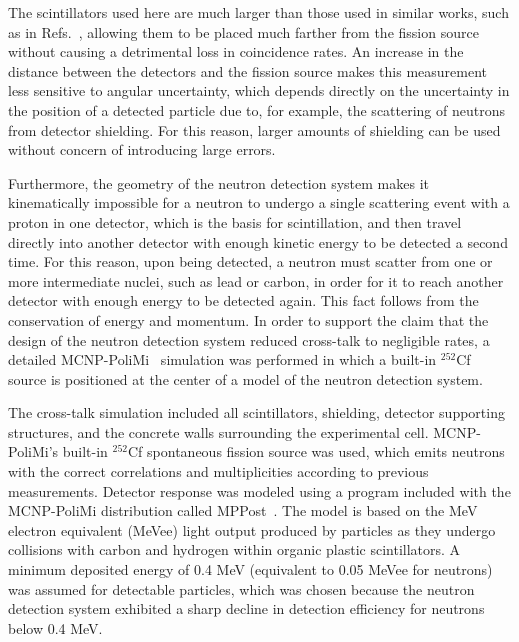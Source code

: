 The scintillators used here are much larger than those used in similar works, such as in Refs.~\cite{Pozzi2016,Verbeke2018}, allowing them to be placed much farther from the fission source without causing a detrimental loss in coincidence rates. 
An increase in the distance between the detectors and the fission source makes this measurement less sensitive to angular uncertainty, which depends directly on the uncertainty in the position of a detected particle due to, for example, the scattering of neutrons from detector shielding.
For this reason, larger amounts of shielding can be used without concern of introducing large errors.
 
Furthermore, the geometry of the neutron detection system makes it kinematically impossible for a neutron to undergo a single scattering event with a proton in one detector, which is the basis for scintillation, and then travel directly into another detector with enough kinetic energy to be detected a second time.
For this reason, upon being detected, a neutron must scatter from one or more intermediate nuclei, such as lead or carbon, in order for it to reach another detector with enough energy to be detected again.
This fact follows from the conservation of energy and momentum.
In order to support the claim that the design of the neutron detection system reduced cross-talk to negligible rates, a detailed MCNP-PoliMi~\cite{MCNP_POLIMI} simulation was performed in which a built-in $^{252}$Cf source is positioned at the center of a model of the neutron detection system.

The cross-talk simulation included all scintillators, shielding, detector supporting structures, and the concrete walls surrounding the experimental cell.
MCNP-PoliMi's built-in $^{252}$Cf spontaneous fission source was used, which emits neutrons with the correct correlations and multiplicities according to previous measurements.
Detector response was modeled using a program included with the MCNP-PoliMi distribution called MPPost~\cite{MPPost}.
The model is based on the MeV electron equivalent (MeVee) light output produced by particles as they undergo collisions with carbon and hydrogen within organic plastic scintillators.
A minimum deposited energy of 0.4 MeV (equivalent to 0.05 MeVee for neutrons) was assumed for detectable particles, which was chosen because the neutron detection system exhibited a sharp decline in detection efficiency for neutrons below 0.4 MeV.


